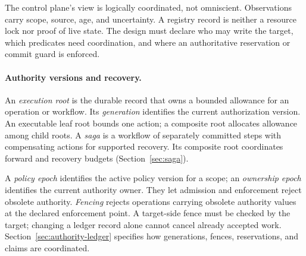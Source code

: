 The control plane's view is logically coordinated, not omniscient. Observations carry scope, source, age, and uncertainty. A registry record is neither a resource lock nor proof of live state. The design must declare who may write the target, which predicates need coordination, and where an authoritative reservation or commit guard is enforced.

\paragraph{Authority versions and recovery.}
An \emph{execution root} is the durable record that owns a bounded allowance for an operation or workflow. Its \emph{generation} identifies the current authorization version. An executable leaf root bounds one action; a composite root allocates allowance among child roots. A \emph{saga} is a workflow of separately committed steps with compensating actions for supported recovery. Its composite root coordinates forward and recovery budgets (Section~\ref{sec:saga}).

A \emph{policy epoch} identifies the active policy version for a scope; an \emph{ownership epoch} identifies the current authority owner. They let admission and enforcement reject obsolete authority. \emph{Fencing} rejects operations carrying obsolete authority values at the declared enforcement point. A target-side fence must be checked by the target; changing a ledger record alone cannot cancel already accepted work. Section~\ref{sec:authority-ledger} specifies how generations, fences, reservations, and claims are coordinated.

